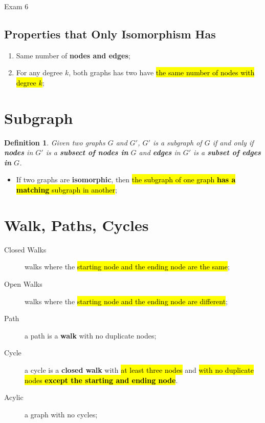 \documentclass{note}
\newtheorem{definition}{Definition}
\begin{document}
\begin{note}{Exam 6}
        \subsection{Properties that Only Isomorphism Has}

        \begin{enumerate}
            \item Same number of \textbf{nodes and edges};
            \item For any degree $ k $, both graphs has two have \hl{the same number of nodes with degree $ k $};
        \end{enumerate}

        \section{Subgraph}

        \begin{definition}
            Given two graphs $ G $ and $ G' $, $ G' $ is a subgraph of $ G $ if and only if \textbf{nodes} in $ G' $ is a
            \textbf{subsect of nodes in} $ G $ and \textbf{edges} in $ G' $ is a \textbf{subset of edges in} $ G $.
        \end{definition}

        \begin{itemize}
            \item If two graphs are \textbf{isomorphic}, then \hl{the subgraph of one graph \textbf{has a matching}
            subgraph in another};
        \end{itemize}

        \section{Walk, Paths, Cycles}

        \begin{description}
            \item[Closed Walks] walks where the \hl{starting node and the ending node are the same};
            \item[Open Walks] walks where the \hl{starting node and the ending node are different};
            \item[Path] a path is a \textbf{walk} with no duplicate nodes;
            \item[Cycle] a cycle is a \textbf{closed walk} with \hl{at least three nodes} and \hl{with no duplicate nodes \textbf{except the
            starting and ending node}}.
            \item[Acylic] a graph with no cycles;
        \end{description}


\end{note}
\end{document}
